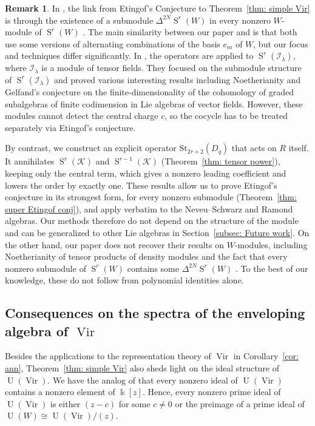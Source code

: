 \documentclass[12pt]{amsart}
\theoremstyle{plain}
\theoremstyle{definition}
\newtheorem{remark}[theorem]{Remark}
\numberwithin{equation}{theorem}
\newcommand{\kk}{\Bbbk}
\newcommand{\Vir}{\operatorname{Vir}}
\newcommand{\Sa}{\operatorname{S}}
\newcommand{\UU}{\operatorname{U}}
\newcommand{\mc}[1]{\mathcal{#1}}
\newcommand{\St}{\mathrm{St}}
\begin{document}
\begin{remark}
In \cite{FeiginKanelKhoroshkin}, the link from Etingof's Conjecture \cite[Conjecture 4.8]{FeiginKanelKhoroshkin} to Theorem~\ref{thm: simple Vir} is through the existence of a submodule $\Delta^{2N}\Sa^r(W)$ in every nonzero $W$-module of $\Sa^r(W)$ \cite[Theorem~3.8]{FeiginKanelKhoroshkin}. The main similarity between our paper and \cite{FeiginKanelKhoroshkin} is that both use some versions of alternating combinations of the basis $e_m$ of $W$, but our focus and techniques differ significantly. In \cite{FeiginKanelKhoroshkin}, the operators are applied to $\Sa^r(\mathcal{I}_\lambda)$, where $\mathcal{I}_\lambda$ is a module of tensor fields. They focused on the submodule structure of $\Sa^r(\mathcal{I}_\lambda)$ and proved various interesting results including Noetherianity and Gelfand's conjecture on the finite-dimensionality of the cohomology of graded subalgebras of finite codimension in Lie algebras of vector fields. However, these modules cannot detect the central charge $c$, so the cocycle has to be treated separately via Etingof's conjecture.

By contrast, we construct an explicit operator $\St_{2r+2}(D_q)$ that acts on $R$ itself. It annihilates $\Sa^r(\mc{K})$ and $\Sa^{r-1}(\mc{K})$ (Theorem~\ref{thm: tensor power}), keeping only the central term, which gives a nonzero leading coefficient and lowers the order by exactly one. These results allow us to prove Etingof's conjecture in its strongest form, for every nonzero submodule (Theorem~\ref{thm: super Etingof conj}), and apply verbatim to the Neveu--Schwarz and Ramond algebras. Our methods therefore do not depend on the structure of the module and can be generalized to other Lie algebras in Section~\ref{subsec: Future work}. On the other hand, our paper does not recover their results on $W$-modules, including Noetherianity of tensor products of density modules and the fact that every nonzero submodule of $\Sa^r(W)$ contains some $\Delta^{2N}\Sa^r(W)$ \cite[Theorem~3.8]{FeiginKanelKhoroshkin}. To the best of our knowledge, these do not follow from polynomial identities alone.
\end{remark}






\subsection{Consequences on the spectra of the enveloping algebra of \texorpdfstring{$\Vir$}{Vir}}\label{subsec: conseq}
Besides the applications to the representation theory of $\Vir$ in Corollary~\ref{cor: ann}, Theorem~\ref{thm: simple Vir} also sheds light on the ideal structure of $\UU(\Vir)$. We have the analog of \cite[Theorem 1.1(3)]{BiswalSierra25} that every nonzero ideal of $\UU(\Vir)$ contains a nonzero element of $\kk[z]$. Hence, every nonzero prime ideal of $\UU(\Vir)$ is either $(z-c)$ for some $c \neq 0$ or the preimage of a prime ideal of $\UU(W) \cong \UU(\Vir)/(z)$.
\end{document}
